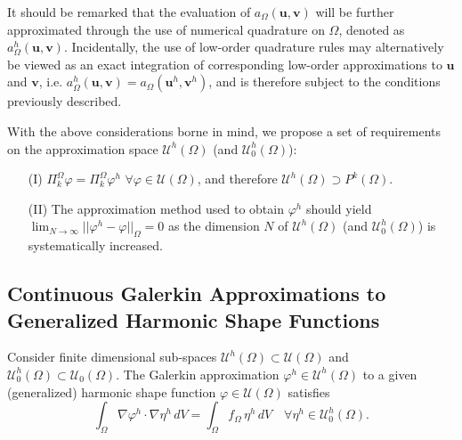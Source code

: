 	It should be remarked that the evaluation of $a_{\Omega}(\mathbf{u},\mathbf{v})$ will be further approximated through the use of numerical quadrature on $\Omega$, denoted as $a^h_{\Omega}(\mathbf{u},\mathbf{v})$. Incidentally, the use of low-order quadrature rules may alternatively be viewed as an exact integration of corresponding low-order approximations to $\mathbf{u}$ and $\mathbf{v}$, i.e. $a^h_{\Omega}(\mathbf{u},\mathbf{v}) = a_{\Omega}(\mathbf{u}^h,\mathbf{v}^h)$, and is therefore subject to the conditions previously described.
	
	With the above considerations borne in mind, we propose a set of requirements on the approximation space $\mathcal{U}^h (\Omega)$ (and $\mathcal{U}^h_0 (\Omega)$):
	\begin{itemize}
		\item[(I)] $\Pi^{\Omega}_k \varphi = \Pi^{\Omega}_k \varphi^h \, \, \forall \varphi \in \mathcal{U}(\Omega)$, and therefore $\mathcal{U}^h (\Omega) \supset P^k (\Omega)$.
		\item[(II)] The approximation method used to obtain $\varphi^h$ should yield $\lim_{N \rightarrow \infty} || \varphi^h - \varphi ||_{\Omega} = 0$ as the dimension $N$ of $\mathcal{U}^h (\Omega)$ (and $\mathcal{U}^h_0 (\Omega)$) is systematically increased.
	\end{itemize}
	
\subsection*{Continuous Galerkin Approximations to \\ Generalized Harmonic Shape Functions}

	Consider finite dimensional sub-spaces $\mathcal{U}^h (\Omega) \subset \mathcal{U} (\Omega)$ and $\mathcal{U}^h_0 (\Omega) \subset \mathcal{U}_0 (\Omega)$. The Galerkin approximation $\varphi^h \in \mathcal{U}^h (\Omega)$ to a given (generalized) harmonic shape function $\varphi \in \mathcal{U} (\Omega)$ satisfies
	\begin{equation}
		\int_\Omega \nabla \varphi^h \cdot \nabla \eta^h \, dV = \int_\Omega f_{\Omega} \, \eta^h \, dV \quad \forall \eta^h \in \mathcal{U}^h_0 (\Omega).
		\label{eq:weak_poisson}
	\end{equation}

